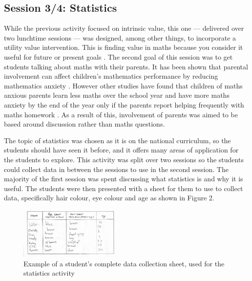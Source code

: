 \documentclass[11pt, a4paper, notitlepage]{article}
\begin{document}
\subsection{Session 3/4: Statistics}

While the previous activity focused on intrinsic value, this one --- delivered over two lunchtime sessions --- was designed, among other things, to incorporate a utility value intervention. This is finding value in maths because you consider it useful for future or present goals \cite{MAES:2024}. The second goal of this session was to get students talking about maths with their parents. It has been shown that parental involvement can affect children's mathematics performance by reducing mathematics anxiety \cite{Vukovic01052013}. However other studies have found that children of maths anxious parents learn less maths over the school year and have more maths anxiety by the end of the year only if the parents report helping frequently with maths homework \cite{Maloney:2015}. As a result of this, involvement of parents was aimed to be based around discussion rather than maths questions.
\par
The topic of statistics was chosen as it is on the national curriculum, so the students should have seen it before, and it offers many areas of application for the students to explore. This activity was split over two sessions so the students could collect data in between the sessions to use in the second session. The majority of the first session was spent discussing what statistics is and why it is useful. The students were then presented with a sheet for them to use to collect data, specifically hair colour, eye colour and age as shown in Figure 2. 
\begin{figure}[htbp]
    \centering
    \includegraphics[width=0.45\textwidth]{Images/data_collection_example.pdf}
    \caption{Example of a student's complete data collection sheet, used for the statistics activity}
\end{figure}
\end{document}
